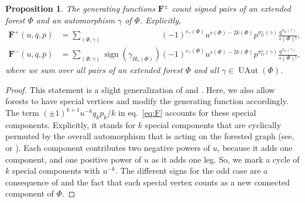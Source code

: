 \documentclass[oneside]{amsart}
\newtheorem{proposition}[theorem]{Proposition}
\theoremstyle{remark}
\newcommand{\bb}[1]{{\overline{#1}}}
\newcommand{\UAut}{{\operatorname{UAut}}}
\newcommand{\sign}{{\operatorname{sign}}}
\begin{document}
\begin{proposition}
\label{prop:genFpm}
The generating functions ${\mathbf F^\pm}$ count signed pairs of an extended forest $\Phi$ and an automorphism $\gamma$ of $\Phi$. 
Explicitly, 
\begin{align*} {\mathbf F^+}(u,\bb q,\bb p) &= \sum_{(\Phi,\gamma)} \phantom{ \sign(\gamma_{H_0(\Phi)}) } (-1)^{e_\gamma(\Phi)} u^{s(\Phi)-2k(\Phi)} p^{\pi_G^\star(\gamma)} \frac{q^{\pi_G(\gamma)} }{s(\Phi)!} ,\\
{\mathbf F^-}(u,\bb q,\bb p) &= \sum_{(\Phi,\gamma)} \sign(\gamma_{H_0(\Phi)}) (-1)^{e_\gamma(\Phi)} u^{s(\Phi)-2k(\Phi)} p^{\pi_G^\star(\gamma)} \frac{q^{\pi_G(\gamma)} }{s(\Phi)!} , \end{align*}
where we sum over all pairs of an extended forest $\Phi$ and 
all $\gamma \in \UAut(\Phi)$.
\end{proposition}
\begin{proof}
This statement is a slight generalization of \cite[Proposition~3.10]{BV2} and \cite[Proposition~5.5]{BV2}. 
Here, we also allow forests to have special vertices and modify the generating function accordingly.
The term 
$(\pm1)^{k+1} u^{-k} q_k p_k/k$ 
in eq.~\eqref{eq:F} accounts for these special components.
Explicitly, it stands for $k$ special components that are cyclically permuted by the overall automorphism that is acting on the forested graph
(see, \cite[Lemma~3.3]{BV2} or \cite{BLL}). 
Each component contributes two negative powers of $u$, because it adds one component, and one positive power of $u$ as 
it adds one leg. So, we mark a cycle of $k$ special components with $u^{-k}$.
The different signs for the odd case are a consequence of \cite[Lemma~5.3]{BV2} and the fact that each special vertex counts as a new connected component of $\Phi$.
\end{proof}
\end{document}
